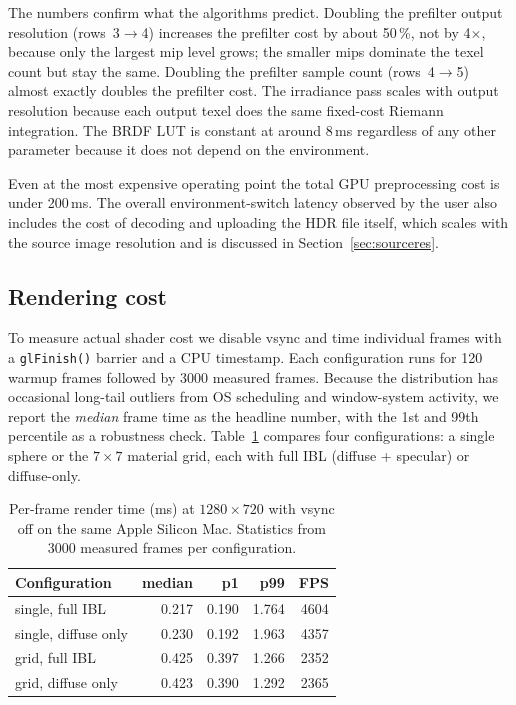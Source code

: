 \documentclass{egpubl}
\begin{document}
The numbers confirm what the algorithms predict. Doubling the prefilter
output resolution (rows~3$\rightarrow$4) increases the prefilter cost by
about 50\,\%, not by 4$\times$, because only the largest mip level grows;
the smaller mips dominate the texel count but stay the same. Doubling the
prefilter sample count (rows~4$\rightarrow$5) almost exactly doubles the
prefilter cost. The irradiance pass scales with output resolution because
each output texel does the same fixed-cost Riemann integration. The BRDF
LUT is constant at around 8\,ms regardless of any other parameter because
it does not depend on the environment.

Even at the most expensive operating point the total GPU preprocessing cost is
under 200\,ms. The overall environment-switch latency observed by the user
also includes the cost of decoding and uploading the HDR file itself, which
scales with the source image resolution and is discussed in
Section~\ref{sec:sourceres}.

\subsection{Rendering cost}

To measure actual shader cost we disable vsync and time individual frames
with a \texttt{glFinish()} barrier and a CPU timestamp. Each configuration
runs for 120 warmup frames followed by 3000 measured frames. Because the
distribution has occasional long-tail outliers from OS scheduling and
window-system activity, we report the \emph{median} frame time as the
headline number, with the 1st and 99th percentile as a robustness check.
Table~\ref{tab:render} compares four configurations: a single sphere or
the $7\!\times\!7$ material grid, each with full IBL (diffuse + specular)
or diffuse-only.

\begin{table}[t]
\centering
\caption{Per-frame render time (ms) at $1280\!\times\!720$ with vsync off
on the same Apple Silicon Mac. Statistics from 3000 measured frames per
configuration.}
\label{tab:render}
\small
\begin{tabular}{lrrrr}
\toprule
Configuration            & median & p1    & p99   & FPS  \\
\midrule
single, full IBL         & 0.217  & 0.190 & 1.764 & 4604 \\
single, diffuse only     & 0.230  & 0.192 & 1.963 & 4357 \\
grid, full IBL           & 0.425  & 0.397 & 1.266 & 2352 \\
grid, diffuse only       & 0.423  & 0.390 & 1.292 & 2365 \\
\bottomrule
\end{tabular}
\end{table}
\end{document}
